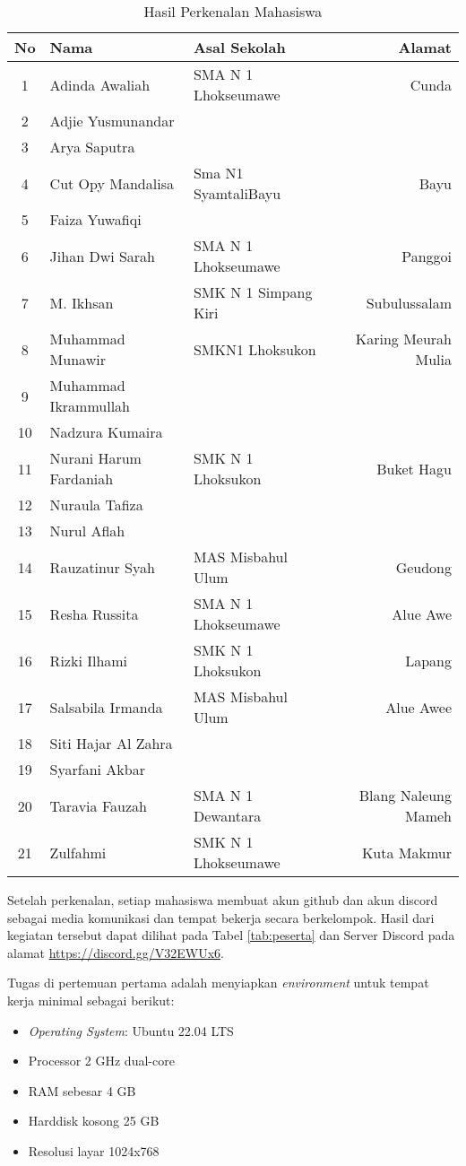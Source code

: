 \documentclass[a4paper]{tufte-handout}
\begin{document}
\begin{table}[!ht]
\caption{Hasil Perkenalan Mahasiswa}
\label{tab:perkenalan}
\centering
\begin{tabular}{cllr} 
\toprule
No & Nama 					& Asal Sekolah 	& Alamat\\
\midrule
1 & Adinda Awaliah			& SMA N 1 Lhokseumawe 	& Cunda \\
2 & Adjie Yusmunandar		& & \\
3 & Arya Saputra			& & \\
4 & Cut Opy Mandalisa		&Sma N1 SyamtaliBayu & Bayu\\
5 & Faiza Yuwafiqi			& & \\
6 & Jihan Dwi Sarah			& SMA N 1 Lhokseumawe 	& Panggoi \\
7 & M. Ikhsan				& SMK N 1 Simpang Kiri 	& Subulussalam \\
\midrule
8 & Muhammad Munawir		& SMKN1 Lhoksukon& Karing Meurah Mulia\\
9 & Muhammad Ikrammullah	& & \\
10 & Nadzura Kumaira		& & \\
11 & Nurani Harum Fardaniah	& SMK N 1 Lhoksukon 	& Buket Hagu \\
12 & Nuraula Tafiza			& & \\
13 & Nurul Aflah			& & \\
14 & Rauzatinur Syah		& MAS Misbahul Ulum 	& Geudong \\
\midrule
15 & Resha Russita			& SMA N 1 Lhokseumawe 	& Alue Awe \\
16 & Rizki Ilhami			& SMK N 1 Lhoksukon 	& Lapang \\
17 & Salsabila Irmanda		& MAS Misbahul Ulum 	& Alue Awee \\
18 & Siti Hajar Al Zahra	& & \\
19 & Syarfani Akbar			& & \\
20 & Taravia Fauzah			& SMA N 1 Dewantara 	& Blang Naleung Mameh \\
21 & Zulfahmi				& SMK N 1 Lhokseumawe   & Kuta Makmur \\
\bottomrule
\end{tabular}
\end{table}

Setelah perkenalan, setiap mahasiswa membuat akun github dan akun discord sebagai media komunikasi dan tempat bekerja secara berkelompok. Hasil dari kegiatan tersebut dapat dilihat pada Tabel \ref{tab:peserta} dan Server Discord pada alamat \url{https://discord.gg/V32EWUx6}.

Tugas di pertemuan pertama adalah menyiapkan \textit{environment} untuk tempat kerja minimal sebagai berikut:
\begin{itemize}
\setlength\itemsep{0em}
\item \textit{Operating System}: Ubuntu 22.04 LTS
\item Processor 2 GHz dual-core
\item RAM sebesar 4 GB
\item Harddisk kosong 25 GB
\item Resolusi layar 1024x768
\end{itemize}
\hrulefill
\end{document}
